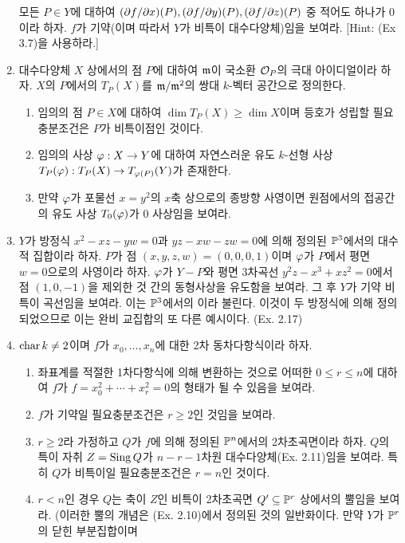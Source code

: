 \begin{enumerate}[label=\tb{5.\arabic*.},itemindent=0mm,itemsep=2mm]
	모든 $P\in Y$에 대하여 $(\partial f/\partial x)(P),(\partial f/\partial y)(P),(\partial f/\partial z)(P)$ 중 적어도 하나가 0이라 하자.
	$f$가 기약(이며 따라서 $Y$가 비특이 대수다양체)임을 보여라. [Hint: (Ex 3.7)을 사용하라.]
	\item 대수다양체 $X$ 상에서의 점 $P$에 대하여 $\mathfrak{m}$이 국소환 $\mathcal{O}_P$의 극대 아이디얼이라 하자.
	$X$의 $P$에서의  $T_P(X)$를 $\mathfrak{m}/\mathfrak{m}^2$의 쌍대 $k$-벡터 공간으로 정의한다.
	\begin{enumerate}[label=(\alph*)]
	\item 임의의 점 $P\in X$에 대하여 $\dim T_P(X)\ge\dim X$이며 등호가 성립할 필요충분조건은 $P$가 비특이점인 것이다.
	\item 임의의 사상 $\varphi:X\rightarrow Y$에 대하여 자연스러운 유도 $k$-선형 사상 $T_P(\varphi):T_P(X)\rightarrow T_{\varphi(P)}(Y)$가 존재한다.
	\item 만약 $\varphi$가 포물선 $x=y^2$의 $x$축 상으로의 종방향 사영이면 원점에서의 접공간의 유도 사상 $T_0(\varphi)$가 0 사상임을 보여라.
	\end{enumerate}
	\item {} $Y$가 방정식 $x^2-xz-yw=0$과 $yz-xw-zw=0$에 의해 정의된
	$\mathbb{P}^3$에서의 대수적 집합이라 하자. $P$가 점 $(x,y,z,w)=(0,0,0,1)$이며 $\varphi$가 $P$에서 평면 $w=0$으로의 사영이라 하자.
	$\varphi$가 $Y-P$와 평면 3차곡선 $y^2z-x^3+xz^2=0$에서 점 $(1,0,-1)$을 제외한 것 간의 동형사상을 유도함을 보여라.
	그 후 $Y$가 기약 비특이 곡선임을 보여라. 이는 $\mathbb{P}^3$에서의 이라 불린다.
	이것이 두 방정식에 의해 정의되었으므로 이는 완비 교집합의 또 다른 예시이다. (Ex. 2.17)
	\item {} $\operatorname{char} k\ne 2$이며 $f$가 $x_0,\ldots,x_n$에 대한 2차 동차다항식이라 하자.
	\begin{enumerate}[label=(\alph*)]
	\item 좌표계를 적절한 1차다항식에 의해 변환하는 것으로 어떠한 $0\le r\le n$에 대하여
	$f$가 $f=x_0^2+\cdots+x_r^2=0$의 형태가 될 수 있음을 보여라.
	\item $f$가 기약일 필요충분조건은 $r\ge 2$인 것임을 보여라.
	\item $r\ge 2$라 가정하고 $Q$가 $f$에 의해 정의된 $\mathbb{P}^n$에서의 2차초곡면이라 하자.
	$Q$의 특이 자취 $Z=\operatorname{Sing} Q$가 $n-r-1$차원  대수다양체(Ex. 2.11)임을 보여라.
	특히 $Q$가 비특이일 필요충분조건은 $r=n$인 것이다.
	\item $r<n$인 경우 $Q$는 축이 $Z$인 비특이 2차초곡면 $Q'\subseteq\mathbb{P}^r$ 상에서의 뿔임을 보여라.
	(이러한 뿔의 개념은 (Ex. 2.10)에서 정의된 것의 일반화이다. 만약 $Y$가 $\mathbb{P}^r$의 닫힌 부분집합이며

\end{enumerate}
\end{enumerate}
